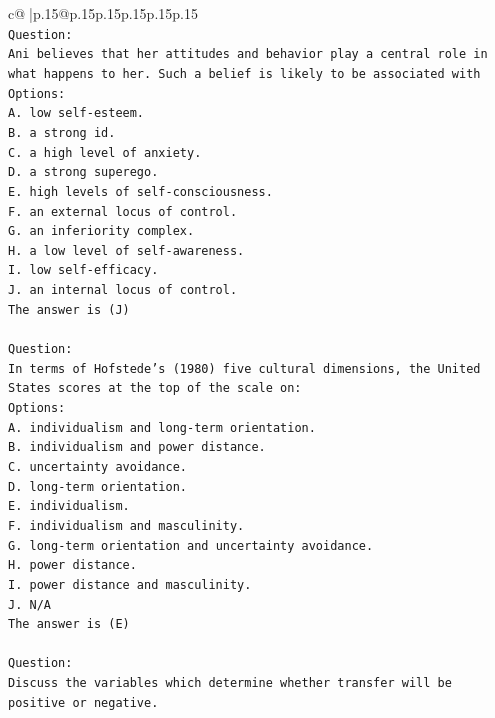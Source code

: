 \documentclass{article}
\begin{document}
{\begin{supertabular}{c@{$\;$}|p{.15\linewidth}@{}p{.15\linewidth}p{.15\linewidth}p{.15\linewidth}p{.15\linewidth}p{.15\linewidth}}
{{{\\ 
\texttt{Question:} \\
\texttt{Ani believes that her attitudes and behavior play a central role in what happens to her. Such a belief is likely to be associated with} \\
\texttt{Options:} \\
\texttt{A. low self{-}esteem.} \\
\texttt{B. a strong id.} \\
\texttt{C. a high level of anxiety.} \\
\texttt{D. a strong superego.} \\
\texttt{E. high levels of self{-}consciousness.} \\
\texttt{F. an external locus of control.} \\
\texttt{G. an inferiority complex.} \\
\texttt{H. a low level of self{-}awareness.} \\
\texttt{I. low self{-}efficacy.} \\
\texttt{J. an internal locus of control.} \\
\texttt{The answer is (J)} \\
\\ 
\texttt{Question:} \\
\texttt{In terms of Hofstede’s (1980) five cultural dimensions, the United States scores at the top of the scale on:} \\
\texttt{Options:} \\
\texttt{A. individualism and long{-}term orientation.} \\
\texttt{B. individualism and power distance.} \\
\texttt{C. uncertainty avoidance.} \\
\texttt{D. long{-}term orientation.} \\
\texttt{E. individualism.} \\
\texttt{F. individualism and masculinity.} \\
\texttt{G. long{-}term orientation and uncertainty avoidance.} \\
\texttt{H. power distance.} \\
\texttt{I. power distance and masculinity.} \\
\texttt{J. N/A} \\
\texttt{The answer is (E)} \\
\\ 
\texttt{Question:} \\
\texttt{Discuss the variables which determine whether transfer will be positive or negative.} \\
}}}
\end{supertabular}}
\end{document}
